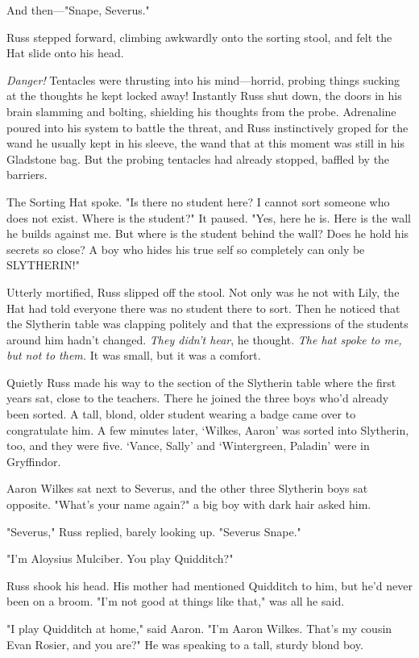 And then—"Snape, Severus."

Russ stepped forward, climbing awkwardly onto the sorting stool, and felt the Hat slide onto his head.

\emph{Danger!} Tentacles were thrusting into his mind—horrid, probing things sucking at the thoughts he kept locked away! Instantly Russ shut down, the doors in his brain slamming and bolting, shielding his thoughts from the probe. Adrenaline poured into his system to battle the threat, and Russ instinctively groped for the wand he usually kept in his sleeve, the wand that at this moment was still in his Gladstone bag. But the probing tentacles had already stopped, baffled by the barriers.

The Sorting Hat spoke. "Is there no student here? I cannot sort someone who does not exist. Where is the student?" It paused. "Yes, here he is. Here is the wall he builds against me. But where is the student behind the wall? Does he hold his secrets so close? A boy who hides his true self so completely can only be{\el} SLYTHERIN!"

Utterly mortified, Russ slipped off the stool. Not only was he not with Lily, the Hat had told everyone there was no student there to sort. Then he noticed that the Slytherin table was clapping politely and that the expressions of the students around him hadn't changed. \emph{They didn't hear}, he thought. \emph{The hat spoke to me, but not to them.} It was small, but it was a comfort.

Quietly Russ made his way to the section of the Slytherin table where the first years sat, close to the teachers. There he joined the three boys who'd already been sorted. A tall, blond, older student wearing a badge came over to congratulate him. A few minutes later, `Wilkes, Aaron' was sorted into Slytherin, too, and they were five. `Vance, Sally' and `Wintergreen, Paladin' were in Gryffindor.

Aaron Wilkes sat next to Severus, and the other three Slytherin boys sat opposite. "What's your name again?" a big boy with dark hair asked him.

"Severus," Russ replied, barely looking up. "Severus{\el} Snape."

"I'm Aloysius Mulciber. You play Quidditch?"

Russ shook his head. His mother had mentioned Quidditch to him, but he'd never been on a broom. "I'm not{\el} good at things like{\el} that," was all he said.

"I play Quidditch at home," said Aaron. "I'm Aaron Wilkes. That's my cousin Evan Rosier, and you are{\el}?" He was speaking to a tall, sturdy blond boy.

